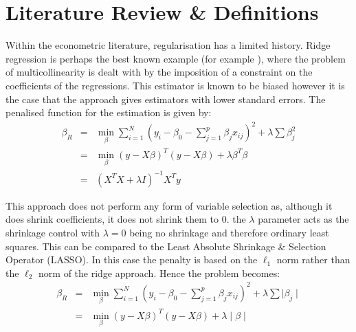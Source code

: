 \documentclass[11pt]{article}
\begin{document}
\section{Literature Review \& Definitions}
Within the econometric literature, regularisation has a limited history. Ridge regression is perhaps the best known example (for example \cite{hoerl1970}), where the problem of multicollinearity is dealt with by the imposition of a constraint on the coefficients of the regressions. This estimator is known to be biased however it is the case that the approach gives estimators with lower standard errors. The penalised function for the estimation is given by:
\begin{eqnarray}
\beta_R&=&\min_\beta \sum_{i=1}^N(y_i-\beta_0-\sum_{j=1}^p \beta_j x_{ij})^2+\lambda \sum \beta_j^2\\
&=&\min_\beta \left(y-X\beta\right)^T\left(y-X\beta\right)+\lambda\beta^T\beta \nonumber \\
&=&\left(X^TX+\lambda I\right)^{-1}X^T y \nonumber
\end{eqnarray}

This approach does not perform any form of variable selection  as, although it does shrink coefficients, it does not shrink them to 0. the $\lambda$ parameter acts as the shrinkage control with $\lambda=0$ being no shrinkage and therefore ordinary least squares. This can be compared to the Least Absolute Shrinkage \& Selection Operator (LASSO). In this case the penalty is based on the $\ell_1$ norm rather than the $\ell_2$ norm of the ridge approach. Hence the problem becomes:
\begin{eqnarray}
\beta_R&=&\min_\beta \sum_{i=1}^N(y_i-\beta_0-\sum_{j=1}^p \beta_j x_{ij})^2+\lambda \sum \mid\beta_j\mid\\
&=&\min_\beta \left(y-X\beta\right)^T\left(y-X\beta\right)+\lambda\mid\beta\mid \nonumber 
\end{eqnarray}\label{lassodef}
\end{document}

